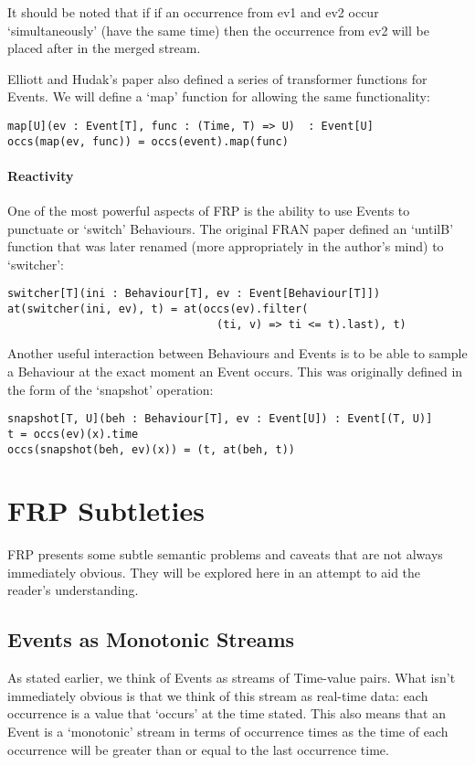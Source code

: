 \documentclass[12pt]{article}
\begin{document}
        It should be noted that if if an occurrence from ev1 and ev2 occur `simultaneously' (have the same time) then
        the occurrence from ev2 will be placed after in the merged stream.
         
         Elliott and Hudak's paper also defined a series of transformer functions for Events. We will define a
         `map' function for allowing the same functionality:
 
\begin{verbatim}
map[U](ev : Event[T], func : (Time, T) => U)  : Event[U]
occs(map(ev, func)) = occs(event).map(func)
\end{verbatim}         
          
        \paragraph{Reactivity}
          One of the most powerful aspects of FRP is the ability to use Events to punctuate or `switch' Behaviours.
          The original FRAN paper defined an `untilB' function that was later renamed (more appropriately in the
          author's mind) to `switcher':

\begin{verbatim}
switcher[T](ini : Behaviour[T], ev : Event[Behaviour[T]])
at(switcher(ini, ev), t) = at(occs(ev).filter(
                                (ti, v) => ti <= t).last), t)
\end{verbatim}

          Another useful interaction between Behaviours and Events is to be able to sample
          a Behaviour at the exact moment an Event occurs. This was originally defined in the
          form of the `snapshot' operation:

\begin{verbatim}
snapshot[T, U](beh : Behaviour[T], ev : Event[U]) : Event[(T, U)]
t = occs(ev)(x).time
occs(snapshot(beh, ev)(x)) = (t, at(beh, t))
\end{verbatim}          
          
          
  \section{FRP Subtleties}
    FRP presents some subtle semantic problems and caveats that are not always immediately obvious.
    They will be explored here in an attempt to aid the reader's understanding.
     
    \subsection{Events as Monotonic Streams}
      As stated earlier, we think of Events as streams of Time-value pairs. What isn't immediately
      obvious is that we think of this stream as real-time data: each occurrence is a value that
      `occurs' at the time stated. This also means that an Event is a `monotonic' stream in terms of
      occurrence times as the time of each occurrence will be greater than or equal to the last occurrence
      time.
      
\end{document}
